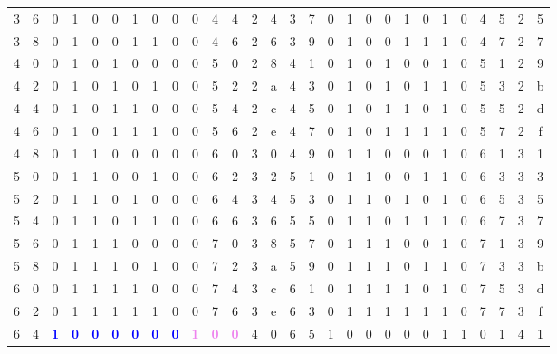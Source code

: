 \begin{table}
{\begin{tabular}{cc|ccccccc|ccc|cc||cc|ccccccc|ccc|cc}
3&6&0&1&0&0&1&0&0&0&4&4&2&4&3&7&0&1&0&0&1&0&1&0&4&5&2&5\\%
\rowcolor{gray!20}3&8&0&1&0&0&1&1&0&0&4&6&2&6&3&9&0&1&0&0&1&1&1&0&4&7&2&7\\%
4&0&0&1&0&1&0&0&0&0&5&0&2&8&4&1&0&1&0&1&0&0&1&0&5&1&2&9\\%
\rowcolor{gray!20}4&2&0&1&0&1&0&1&0&0&5&2&2&a&4&3&0&1&0&1&0&1&1&0&5&3&2&b\\%
4&4&0&1&0&1&1&0&0&0&5&4&2&c&4&5&0&1&0&1&1&0&1&0&5&5&2&d\\%
\rowcolor{gray!20}4&6&0&1&0&1&1&1&0&0&5&6&2&e&4&7&0&1&0&1&1&1&1&0&5&7&2&f\\%
4&8&0&1&1&0&0&0&0&0&6&0&3&0&4&9&0&1&1&0&0&0&1&0&6&1&3&1\\%
\rowcolor{gray!20}5&0&0&1&1&0&0&1&0&0&6&2&3&2&5&1&0&1&1&0&0&1&1&0&6&3&3&3\\%
5&2&0&1&1&0&1&0&0&0&6&4&3&4&5&3&0&1&1&0&1&0&1&0&6&5&3&5\\%
\rowcolor{gray!20}5&4&0&1&1&0&1&1&0&0&6&6&3&6&5&5&0&1&1&0&1&1&1&0&6&7&3&7\\%
5&6&0&1&1&1&0&0&0&0&7&0&3&8&5&7&0&1&1&1&0&0&1&0&7&1&3&9\\%
\rowcolor{gray!20}5&8&0&1&1&1&0&1&0&0&7&2&3&a&5&9&0&1&1&1&0&1&1&0&7&3&3&b\\%
6&0&0&1&1&1&1&0&0&0&7&4&3&c&6&1&0&1&1&1&1&0&1&0&7&5&3&d\\%
\rowcolor{gray!20}6&2&0&1&1&1&1&1&0&0&7&6&3&e&6&3&0&1&1&1&1&1&1&0&7&7&3&f\\%
6&4&\textcolor{blue}{\textbf{1}}&\textcolor{blue}{\textbf{0}}&\textcolor{blue}{\textbf{0}}&\textcolor{blue}{\textbf{0}}&\textcolor{blue}{\textbf{0}}&\textcolor{blue}{\textbf{0}}&\textcolor{blue}{\textbf{0}}&\textcolor{violet}{\textbf{1}}&\textcolor{violet}{\textbf{0}}&\textcolor{violet}{\textbf{0}}&4&0&6&5&1&0&0&0&0&0&1&1&0&1&4&1\\%
\hline%
\end{tabular}%
}%
\end{table}%
